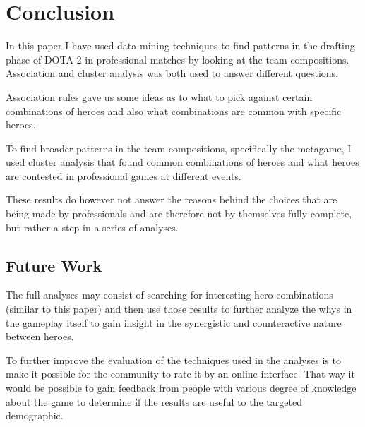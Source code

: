 \documentclass[result.tex]{subfiles}
\begin{document}
\section*{\centering Conclusion}

In this paper I have used data mining techniques to find patterns in the drafting phase of DOTA 2 in professional matches by looking at the team compositions. Association and cluster analysis was both used to answer different questions.

Association rules gave us some ideas as to what to pick against certain combinations of heroes and also what combinations are common with specific heroes.

To find broader patterns in the team compositions, specifically the metagame, I used cluster analysis that found common combinations of heroes and what heroes are contested in professional games at different events.

These results do however not answer the reasons behind the choices that are being made by professionals and are therefore not by themselves fully complete, but rather a step in a series of analyses.

\subsection*{Future Work}

The full analyses may consist of searching for interesting hero combinations (similar to this paper) and then use those results to further analyze the whys in the gameplay itself to gain insight in the synergistic and counteractive nature between heroes.

To further improve the evaluation of the techniques used in the analyses is to make it possible for the community to rate it by an online interface. That way it would be possible to gain feedback from people with various degree of knowledge about the game to determine if the results are useful to the targeted demographic.
\end{document}

